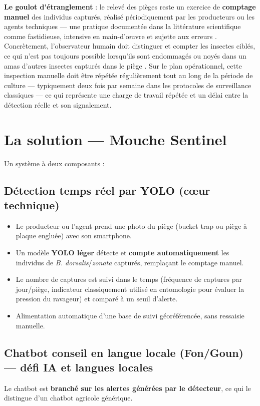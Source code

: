 \documentclass[11pt,a4paper]{article}
\begin{document}
\textbf{Le goulot d'étranglement} : le relevé des pièges reste un exercice de \textbf{comptage manuel} des individus capturés, réalisé périodiquement par les producteurs ou les agents techniques --- une pratique documentée dans la littérature scientifique comme fastidieuse, intensive en main-d'œuvre et sujette aux erreurs \cite{review_ff}. Concrètement, l'observateur humain doit distinguer et compter les insectes ciblés, ce qui n'est pas toujours possible lorsqu'ils sont endommagés ou noyés dans un amas d'autres insectes capturés dans le piège \cite{surveillance_ff}. Sur le plan opérationnel, cette inspection manuelle doit être répétée régulièrement tout au long de la période de culture --- typiquement deux fois par semaine dans les protocoles de surveillance classiques \cite{embrapa_ff} --- ce qui représente une charge de travail répétée et un délai entre la détection réelle et son signalement.

\section{La solution --- Mouche Sentinel}

Un système à deux composants :

\subsection{Détection temps réel par YOLO (cœur technique)}
\begin{itemize}
    \item Le producteur ou l'agent prend une photo du piège (bucket trap ou piège à plaque engluée) avec son smartphone.
    \item Un modèle \textbf{YOLO léger} détecte et \textbf{compte automatiquement} les individus de \textit{B. dorsalis}/\textit{zonata} capturés, remplaçant le comptage manuel.
    \item Le nombre de captures est suivi dans le temps (fréquence de captures par jour/piège, indicateur classiquement utilisé en entomologie pour évaluer la pression du ravageur) et comparé à un seuil d'alerte.
    \item Alimentation automatique d'une base de suivi géoréférencée, sans ressaisie manuelle.
\end{itemize}

\subsection{Chatbot conseil en langue locale (Fon/Goun) --- défi IA et langues locales}
Le chatbot est \textbf{branché sur les alertes générées par le détecteur}, ce qui le distingue d'un chatbot agricole générique.
\end{document}

